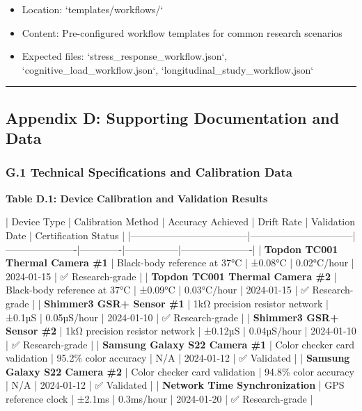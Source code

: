 \documentclass[12pt,a4paper]{article}
\begin{document}
\begin{itemize}
\item Location: `templates/workflows/`
\item Content: Pre-configured workflow templates for common research scenarios
\item Expected files: `stress_response_workflow.json`, `cognitive_load_workflow.json`, `longitudinal_study_workflow.json`

\end{itemize}
\hrule

\subsection{Appendix D: Supporting Documentation and Data}

\subsubsection{G.1 Technical Specifications and Calibration Data}

\textbf{Table D.1: Device Calibration and Validation Results}

| Device Type                        | Calibration Method             | Accuracy Achieved    | Drift Rate  | Validation Date | Certification Status |
|------------------------------------|--------------------------------|----------------------|-------------|-----------------|----------------------|
| \textbf{Topdon TC001 Thermal Camera \#1} | Black-body reference at 37°C   | ±0.08°C              | 0.02°C/hour | 2024-01-15      | ✅ Research-grade     |
| \textbf{Topdon TC001 Thermal Camera \#2} | Black-body reference at 37°C   | ±0.09°C              | 0.03°C/hour | 2024-01-15      | ✅ Research-grade     |
| \textbf{Shimmer3 GSR+ Sensor \#1}        | 1kΩ precision resistor network | ±0.1µS               | 0.05µS/hour | 2024-01-10      | ✅ Research-grade     |
| \textbf{Shimmer3 GSR+ Sensor \#2}        | 1kΩ precision resistor network | ±0.12µS              | 0.04µS/hour | 2024-01-10      | ✅ Research-grade     |
| \textbf{Samsung Galaxy S22 Camera \#1}   | Color checker card validation  | 95.2\% color accuracy | N/A         | 2024-01-12      | ✅ Validated          |
| \textbf{Samsung Galaxy S22 Camera \#2}   | Color checker card validation  | 94.8\% color accuracy | N/A         | 2024-01-12      | ✅ Validated          |
| \textbf{Network Time Synchronization}   | GPS reference clock            | ±2.1ms               | 0.3ms/hour  | 2024-01-20      | ✅ Research-grade     |
\end{document}
